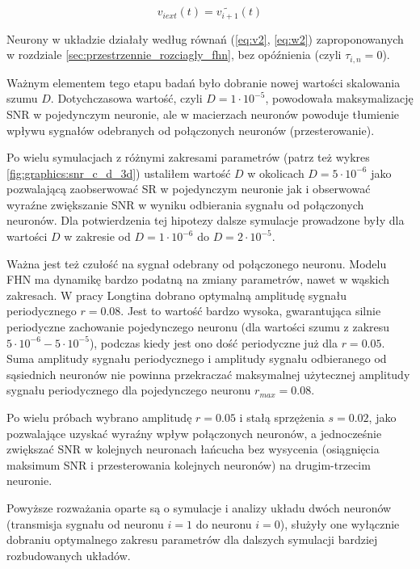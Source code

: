   \begin{equation} \label{eq:vext2}
    v_{i ext}(t) = \widetilde{v_{i+1}}(t)
  \end{equation}

  Neurony w układzie działały według równań (\ref{eq:v2}, \ref{eq:w2}) zaproponowanych w rozdziale \ref{sec:przestrzennie_rozciagly_fhn}, bez opóźnienia (czyli $\tau_{i,n} = 0$).

  Ważnym elementem tego etapu badań było dobranie nowej wartości skalowania szumu $D$. Dotychczasowa wartość, czyli $D=1 \cdot 10^{-5}$, powodowała maksymalizację SNR w pojedynczym neuronie, ale w macierzach neuronów powoduje tłumienie wpływu sygnałów odebranych od połączonych neuronów (przesterowanie).

  Po wielu symulacjach z różnymi zakresami parametrów (patrz też wykres \ref{fig:graphics:snr_c_d_3d}) ustaliłem wartość $D$ w okolicach $D=5 \cdot 10^{-6}$ jako pozwalającą zaobserwować SR w pojedynczym neuronie jak i obserwować wyraźne zwiększanie SNR w wyniku odbierania sygnału od połączonych neuronów. Dla potwierdzenia tej hipotezy dalsze symulacje prowadzone były dla wartości $D$ w zakresie od $D=1 \cdot 10^{-6}$ do $D=2 \cdot 10^{-5}$. 

  Ważna jest też czułość na sygnał odebrany od połączonego neuronu. Modelu FHN ma dynamikę bardzo podatną na zmiany parametrów, nawet w wąskich zakresach. W pracy Longtina dobrano optymalną amplitudę sygnału periodycznego $r=0.08$. Jest to wartość bardzo wysoka, gwarantująca silnie periodyczne zachowanie pojedynczego neuronu (dla wartości szumu z zakresu $5 \cdot 10^{-6} - 5 \cdot 10^{-5}$), podczas kiedy jest ono dość periodyczne już dla $r=0.05$. Suma amplitudy sygnału periodycznego i amplitudy sygnału odbieranego od sąsiednich neuronów nie powinna przekraczać maksymalnej użytecznej amplitudy sygnału periodycznego dla pojedynczego neuronu $r_{max}=0.08$.
  
  Po wielu próbach wybrano amplitudę $r=0.05$ i stałą sprzężenia $s=0.02$, jako pozwalające uzyskać wyraźny wpływ połączonych neuronów, a jednocześnie zwiększać SNR w kolejnych neuronach łańcucha bez wysycenia (osiągnięcia maksimum SNR i przesterowania kolejnych neuronów) na drugim-trzecim neuronie.

  Powyższe rozważania oparte są o symulacje i analizy układu dwóch neuronów (transmisja sygnału od neuronu $i=1$ do neuronu $i=0$), służyły one wyłącznie dobraniu optymalnego zakresu parametrów dla dalszych symulacji bardziej rozbudowanych układów.


